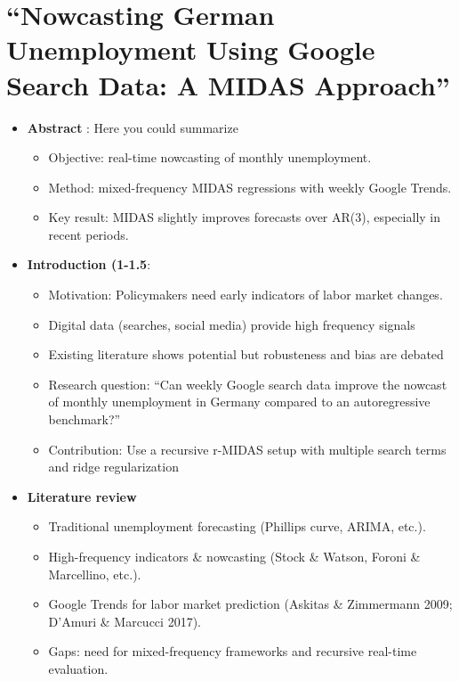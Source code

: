 \documentclass{article}
\begin{document}
\section*{“Nowcasting German Unemployment Using Google Search Data: A MIDAS Approach”}

\begin{itemize}
    \item\textbf{Abstract} : Here you could summarize
    \begin{itemize}
        \item Objective: real-time nowcasting of monthly unemployment.
        \item Method: mixed-frequency MIDAS regressions with weekly Google Trends.
        \item Key result: MIDAS slightly improves forecasts over AR(3), especially in recent periods.
    \end{itemize}

    \item  \textbf{Introduction (1-1.5}: 
    \begin{itemize}
        \item Motivation: Policymakers need early indicators of labor market changes.
        \item Digital data (searches, social media) provide high frequency signals 
        \item Existing literature shows potential but robusteness and bias are debated
        \item Research question: “Can weekly Google search data improve the nowcast of monthly unemployment in Germany compared to an autoregressive benchmark?”
        \item Contribution: Use a recursive r-MIDAS setup with multiple search terms and ridge regularization
    \end{itemize}

    \item  \textbf{Literature review}
    \begin{itemize}
        \item Traditional unemployment forecasting (Phillips curve, ARIMA, etc.).
        \item  High-frequency indicators \& nowcasting (Stock \& Watson, Foroni \& Marcellino, etc.).
        \item Google Trends for labor market prediction (Askitas \& Zimmermann 2009; D’Amuri & Marcucci 2017).
        \item Gaps: need for mixed-frequency frameworks and recursive real-time evaluation.
    \end{itemize}


\end{itemize}
\end{document}
